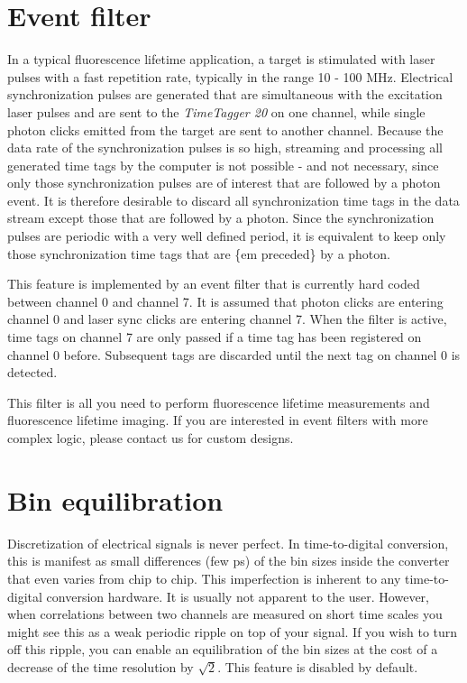 \documentclass[letterpaper,10pt,english]{sphinxmanual}
\begin{document}
\section{Event filter}
\label{sections/hardware:event-filter}
In a typical fluorescence lifetime application, a target is stimulated with laser pulses with
a fast repetition rate, typically in the range 10 - 100 MHz. Electrical synchronization pulses
are generated that are simultaneous with the excitation laser pulses and are sent to
the \emph{TimeTagger 20} on one channel, while single photon clicks emitted from the target are sent to another channel.
Because the data rate of the synchronization pulses is so high, streaming and processing all generated
time tags by the computer is not possible - and not necessary, since only those synchronization
pulses are of interest that are followed by a photon event. It is therefore desirable
to discard all synchronization time tags in the data stream except those that are followed by a photon.
Since the synchronization pulses are periodic with a very well defined period, it is equivalent
to keep only those synchronization time tags that are \{em preceded\} by a photon.

This feature is implemented by an event filter that is currently hard coded between
channel 0 and channel 7. It is assumed that photon clicks are entering channel 0 and laser sync clicks
are entering channel 7. When the filter is active, time tags on channel 7 are only passed
if a time tag has been registered on channel 0 before. Subsequent tags are discarded until the next
tag on channel 0 is detected.

This filter is all you need to perform fluorescence lifetime measurements and fluorescence lifetime imaging.
If you are interested in event filters with more complex logic, please contact us for custom designs.


\section{Bin equilibration}
\label{sections/hardware:bin-equilibration}
Discretization of electrical signals is never perfect. In time-to-digital conversion, this is manifest
as small differences (few ps) of the bin sizes inside the converter that even varies from chip to chip.
This imperfection is inherent to any time-to-digital conversion hardware.
It is usually not apparent to the user. However, when correlations between two channels are measured on short
time scales you might see this as a weak periodic ripple on top of your signal.
If you wish to turn off this ripple, you can enable an equilibration of the bin sizes
at the cost of a decrease of the time resolution by \(\sqrt{2}\). This feature is disabled by default.
\end{document}
